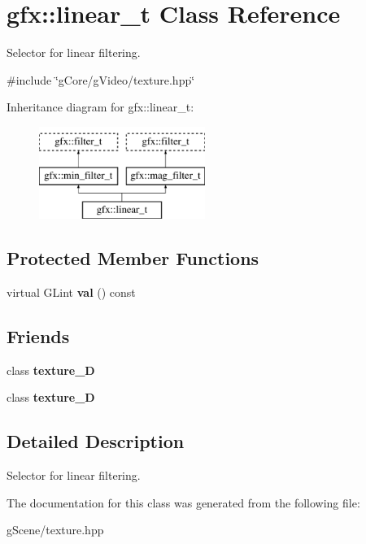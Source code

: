 \hypertarget{classgfx_1_1linear__t}{\section{gfx\-:\-:linear\-\_\-t Class Reference}
\label{classgfx_1_1linear__t}
}


Selector for linear filtering.  




{\ttfamily \#include \char`\"{}g\-Core/g\-Video/texture.\-hpp\char`\"{}}

Inheritance diagram for gfx\-:\-:linear\-\_\-t\-:\begin{figure}[H]
\begin{center}
\leavevmode
\includegraphics[height=3.000000cm]{classgfx_1_1linear__t}
\end{center}
\end{figure}
\subsection*{Protected Member Functions}
\begin{DoxyCompactItemize}
\item 
\hypertarget{classgfx_1_1linear__t_ab9aa2432c42932752d0f0d9579e17276}{virtual G\-Lint {\bfseries val} () const }\label{classgfx_1_1linear__t_ab9aa2432c42932752d0f0d9579e17276}

\end{DoxyCompactItemize}
\subsection*{Friends}
\begin{DoxyCompactItemize}
\item 
\hypertarget{classgfx_1_1linear__t_a2039d67f6166ccf823c78e3476aad9aa}{class {\bfseries texture\-\_\-D}}\label{classgfx_1_1linear__t_a2039d67f6166ccf823c78e3476aad9aa}

\item 
\hypertarget{classgfx_1_1linear__t_a22ad86ef46c3b17357a0cd59e50bc7dd}{class {\bfseries texture\-\_\-D}}\label{classgfx_1_1linear__t_a22ad86ef46c3b17357a0cd59e50bc7dd}

\end{DoxyCompactItemize}


\subsection{Detailed Description}
Selector for linear filtering. 

The documentation for this class was generated from the following file\-:\begin{DoxyCompactItemize}
\item 
g\-Scene/texture.\-hpp\end{DoxyCompactItemize}
